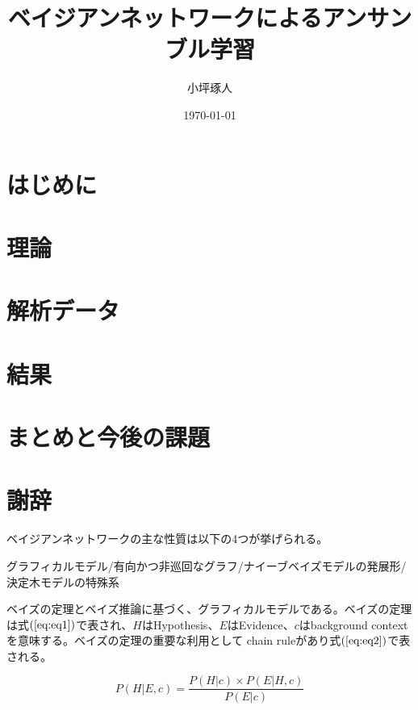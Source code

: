\documentclass[a4paper,12pt]{jarticle}
\title{ベイジアンネットワークによるアンサンブル学習}   %
\author{小坪琢人}   %
\date{\today}   %
\begin{document}
\maketitle   %
\setlength{\baselineskip}{20pt}   %
\tableofcontents   %
\listoffigures   %
\listoftables   %
\clearpage   %


\section{はじめに}

\section{理論}

\section{解析データ}

\section{結果}

\section{まとめと今後の課題}

\section{謝辞}

ベイジアンネットワークの主な性質は以下の4つが挙げられる。

グラフィカルモデル/有向かつ非巡回なグラフ/ナイーブベイズモデルの発展形/決定木モデルの特殊系

ベイズの定理とベイズ推論に基づく、グラフィカルモデルである。ベイズの定理は式$(\ref{eq:eq1})$で表され、$H$はHypothesis、$E$はEvidence、$c$はbackground contextを意味する。ベイズの定理の重要な利用として chain ruleがあり式$(\ref{eq:eq2})$で表される。

\begin{equation}
\label{eq:eq1}
P(H|E,c) = \frac{P(H|c) \times P(E|H,c)}{P(E|c)}
\end{equation}
\end{document}
